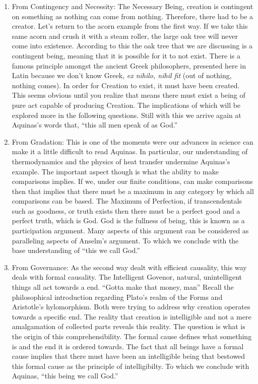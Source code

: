 \documentclass{ucetd}
\begin{document}
\begin{enumerate}
    \item From Contingency and Necessity: The Necessary Being, creation is contingent on something as nothing can come from nothing. Therefore, there had to be a creator. Let's return to the acorn example from the first way. If we take this same acorn and crush it with a steam roller, the large oak tree will never come into existence. According to this the oak tree that we are discussing is a contingent being, meaning that it is possible for it to not exist. There is a famous principle amongst the ancient Greek philosophers, presented here in Latin because we don't know Greek, \textit{ex nihilo, nihil fit} (out of nothing, nothing comes). In order for Creation to exist, it must have been created. This seems obvious until you realize that means there must exist a being of pure act capable of producing Creation. The implications of which will be explored more in the following questions. Still with this we arrive again at Aquinas's words that, ``this all men speak of as God.''
    \item From Gradation: This is one of the moments were our advances in science can make it a little difficult to read Aquinas. In particular, our understanding of thermodynamics and the physics of heat transfer undermine Aquinas's example. The important aspect though is what the ability to make comparisons implies. If we, under our finite conditions, can make comparisons then that implies that there must be a maximum in any category by which all comparisons can be based. The Maximum of Perfection, if transcendentals such as goodness, or truth exists then there must be a perfect good and a perfect truth, which is God. God is the fullness of being, this is known as a participation argument. Many aspects of this argument can be considered as paralleling aspects of Anselm's argument. To which we conclude with the base understanding of ``this we call God.''
    \item From Governance: As the second way dealt with efficient causality, this way deals with formal causality. The Intelligent Govenor, natural, unintelligent things all act towards a end. ``Gotta make that money, man''\cite{eazye} Recall the philosophical introduction regarding Plato's realm of the Forms and Aristotle's hylomorphism. Both were trying to address why creation operates towards a specific end. The reality that creation is intelligible and not a mere amalgamation of collected parts reveals this reality. The question is what is the origin of this comprehensibility. The formal cause defines what something is and the end it is ordered towards. The fact that all beings have a formal cause implies that there must have been an intelligible being that bestowed this formal cause as the principle of intelligibilty. To which we conclude with Aquinas, ``this being we call God.''
\end{enumerate}
\end{document}
